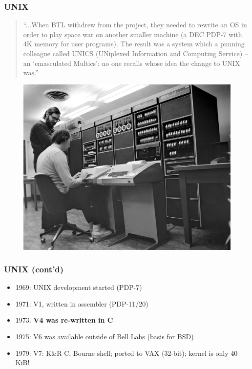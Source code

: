 \begin{frame}
  \frametitle{UNIX}
    \begin{quotation}
``...When BTL withdrew from the project, they needed to rewrite an OS in order
to play space war on another smaller machine (a DEC PDP-7 with 4K memory
for user programs). The result was a system which a punning colleague
called UNICS (UNiplexed Information and Computing Service) -- an
`emasculated Multics'; no one recalls whose idea the change to UNIX was.''
    \end{quotation}
    \vspace*{-5mm} %
    \begin{figure}
      \centering
      \includegraphics[scale=0.8]{images/ken-and-dennis.jpg}
    \end{figure}
    \vspace*{-12mm} %
\end{frame}

\begin{frame}
  \frametitle{UNIX (cont'd)}
  \begin{itemize}
    \item 1969: \textsc{UNIX} development started (PDP-7)
    \item 1971: V1, written in assembler (PDP-11/20)
    \item 1973: \textbf{V4 was re-written in C}
    \item 1975: V6 was available outside of Bell Labs (basis for BSD)
    \item 1979: V7: K\&R C, Bourne shell; ported to VAX (32-bit); kernel is only 40 KiB!
  \end{itemize}
\end{frame}

